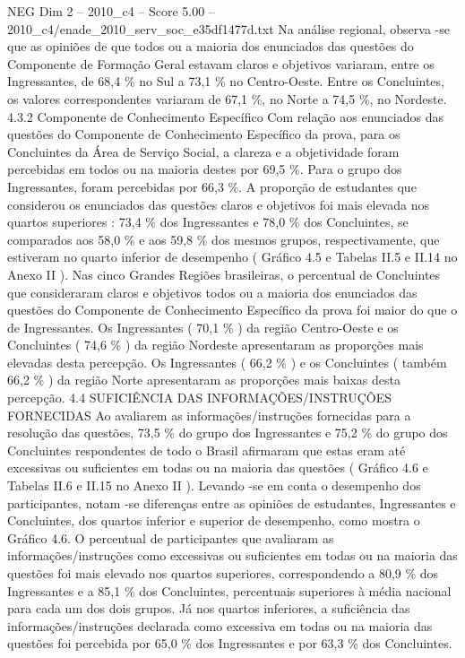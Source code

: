 \begin{textsample}{NEG Dim 2 – 2010\_c4 – Score 5.00 – 2010\_c4/enade\_2010\_serv\_soc\_e35df1477d.txt}
Na análise regional, observa -se que as opiniões de que todos ou a maioria dos enunciados das questões do Componente de Formação Geral estavam claros e objetivos variaram, entre os Ingressantes, de 68,4 \% no Sul a 73,1 \% no Centro-Oeste.
Entre os Concluintes, os valores correspondentes variaram de 67,1 \%, no Norte a 74,5 \%, no Nordeste. 4.3.2 Componente de Conhecimento Específico Com relação aos enunciados das questões do Componente de Conhecimento Específico da prova, para os Concluintes da Área de Serviço Social, a clareza e a objetividade foram percebidas em todos ou na maioria destes por 69,5 \%.
Para o grupo dos Ingressantes, foram percebidas por 66,3 \%.
A proporção de estudantes que considerou os enunciados das questões claros e objetivos foi mais elevada nos quartos superiores : 73,4 \% dos Ingressantes e 78,0 \% dos Concluintes, se comparados aos 58,0 \% e aos 59,8 \% dos mesmos grupos, respectivamente, que estiveram no quarto inferior de desempenho ( Gráfico 4.5 e Tabelas II.5 e II.14 no Anexo II ).
Nas cinco Grandes Regiões brasileiras, o percentual de Concluintes que consideraram claros e objetivos todos ou a maioria dos enunciados das questões do Componente de Conhecimento Específico da prova foi maior do que o de Ingressantes.
Os Ingressantes ( 70,1 \% ) da região Centro-Oeste e os Concluintes ( 74,6 \% ) da região Nordeste apresentaram as proporções mais elevadas desta percepção.
Os Ingressantes ( 66,2 \% ) e os Concluintes ( também 66,2 \% ) da região Norte apresentaram as proporções mais baixas desta percepção. 4.4 SUFICIÊNCIA DAS INFORMAÇÕES/INSTRUÇÕES FORNECIDAS Ao avaliarem as informações/instruções fornecidas para a resolução das questões, 73,5 \% do grupo dos Ingressantes e 75,2 \% do grupo dos Concluintes respondentes de todo o Brasil afirmaram que estas eram até excessivas ou suficientes em todas ou na maioria das questões ( Gráfico 4.6 e Tabelas II.6 e II.15 no Anexo II ).
Levando -se em conta o desempenho dos participantes, notam -se diferenças entre as opiniões de estudantes, Ingressantes e Concluintes, dos quartos inferior e superior de desempenho, como mostra o Gráfico 4.6.
O percentual de participantes que avaliaram as informações/instruções como excessivas ou suficientes em todas ou na maioria das questões foi mais elevado nos quartos superiores, correspondendo a 80,9 \% dos Ingressantes e a 85,1 \% dos Concluintes, percentuais superiores à média nacional para cada um dos dois grupos.
Já nos quartos inferiores, a suficiência das informações/instruções declarada como excessiva em todas ou na maioria das questões foi percebida por 65,0 \% dos Ingressantes e por 63,3 \% dos Concluintes.

\end{textsample}
